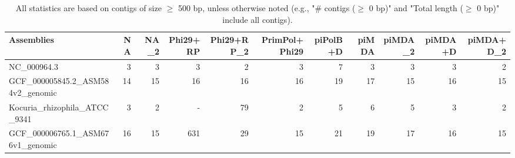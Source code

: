 \documentclass[12pt,a4paper]{article}
\begin{document}
\begin{table}[ht]
\begin{center}
\caption{All statistics are based on contigs of size $\geq$ 500 bp, unless otherwise noted (e.g., "\# contigs ($\geq$ 0 bp)" and "Total length ($\geq$ 0 bp)" include all contigs).}
\begin{tabular}{|l*{10}{|r}|}
\hline
Assemblies & NA & NA\_2 & Phi29+RP & Phi29+RP\_2 & PrimPol+Phi29 & piPolB+D & piMDA & piMDA\_2 & piMDA+D & piMDA+D\_2 \\ \hline
NC\_000964.3 & 3 & 3 & 3 & 2 & 3 & 7 & 3 & 3 & 3 & 2 \\ \hline
GCF\_000005845.2\_ASM584v2\_genomic & 14 & 15 & 16 & 16 & 16 & 19 & 17 & 15 & 16 & 15 \\ \hline
Kocuria\_rhizophila\_ATCC\_9341 & 3 & 2 & - & 79 & 2 & 5 & 6 & 5 & 3 & 2 \\ \hline
GCF\_000006765.1\_ASM676v1\_genomic & 16 & 15 & 631 & 29 & 15 & 21 & 19 & 17 & 16 & 15 \\ \hline
\end{tabular}
\end{center}
\end{table}
\end{document}
